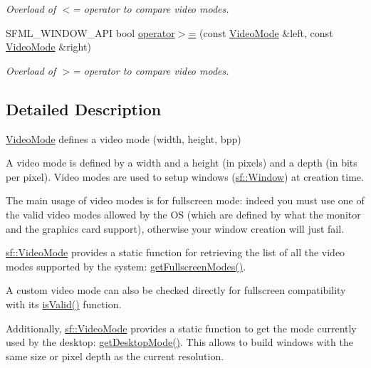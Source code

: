 \begin{DoxyCompactItemize}
\begin{DoxyCompactList}\small\item\em Overload of $<$= operator to compare video modes. \end{DoxyCompactList}\item 
S\+F\+M\+L\+\_\+\+W\+I\+N\+D\+O\+W\+\_\+\+A\+PI bool \mbox{\hyperlink{classsf_1_1_video_mode_a7f7983e336203d34c9878c77fff60f1f}{operator$>$=}} (const \mbox{\hyperlink{classsf_1_1_video_mode}{Video\+Mode}} \&left, const \mbox{\hyperlink{classsf_1_1_video_mode}{Video\+Mode}} \&right)
\begin{DoxyCompactList}\small\item\em Overload of $>$= operator to compare video modes. \end{DoxyCompactList}\end{DoxyCompactItemize}


\subsection{Detailed Description}
\mbox{\hyperlink{classsf_1_1_video_mode}{Video\+Mode}} defines a video mode (width, height, bpp) 

\begin{DoxyVerb}\end{DoxyVerb}


A video mode is defined by a width and a height (in pixels) and a depth (in bits per pixel). Video modes are used to setup windows (\mbox{\hyperlink{classsf_1_1_window}{sf\+::\+Window}}) at creation time.

The main usage of video modes is for fullscreen mode\+: indeed you must use one of the valid video modes allowed by the OS (which are defined by what the monitor and the graphics card support), otherwise your window creation will just fail.

\mbox{\hyperlink{classsf_1_1_video_mode}{sf\+::\+Video\+Mode}} provides a static function for retrieving the list of all the video modes supported by the system\+: \mbox{\hyperlink{classsf_1_1_video_mode_a6815b9b3b35767d5b4563fbed4bfc67b}{get\+Fullscreen\+Modes()}}.

A custom video mode can also be checked directly for fullscreen compatibility with its \mbox{\hyperlink{classsf_1_1_video_mode_ad5e04c044b0925523c75ecb173d2129a}{is\+Valid()}} function.

Additionally, \mbox{\hyperlink{classsf_1_1_video_mode}{sf\+::\+Video\+Mode}} provides a static function to get the mode currently used by the desktop\+: \mbox{\hyperlink{classsf_1_1_video_mode_ac1be160a4342e6eafb2cb0e8c9b18d44}{get\+Desktop\+Mode()}}. This allows to build windows with the same size or pixel depth as the current resolution.

